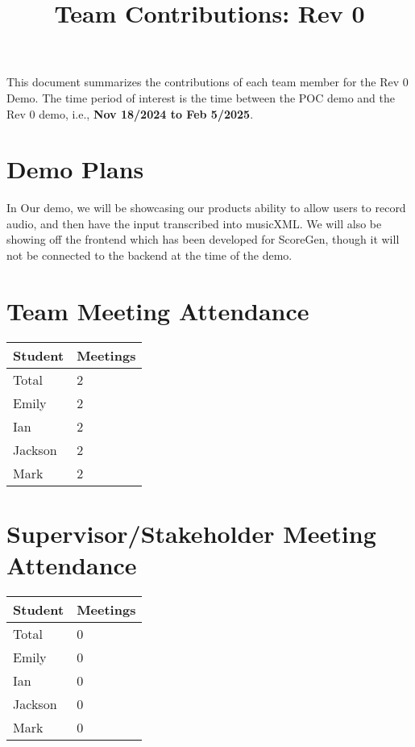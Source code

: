 \documentclass{article}
\title{Team Contributions: Rev 0\\\progname}
\author{\authname}
\date{}
\begin{document}
\maketitle

This document summarizes the contributions of each team member for the Rev 0
Demo.  The time period of interest is the time between the POC demo and the Rev
0 demo, i.e., \textbf{Nov 18/2024 to Feb 5/2025}.

\section{Demo Plans}

In Our demo, we will be showcasing our products ability to allow users to record audio, and then have the input transcribed into musicXML. We will also be showing off the frontend which has been developed for ScoreGen, though it will not be connected to the backend at the time of the demo.

\section{Team Meeting Attendance}

\begin{table}[H]
\centering
\begin{tabular}{ll}
\toprule
\textbf{Student} & \textbf{Meetings}\\
\midrule
Total & 2\\
Emily & 2\\
Ian & 2\\
Jackson & 2\\
Mark & 2\\
\bottomrule
\end{tabular}
\end{table}

\section{Supervisor/Stakeholder Meeting Attendance}

\begin{table}[H]
\centering
\begin{tabular}{ll}
\toprule
\textbf{Student} & \textbf{Meetings}\\
\midrule
Total & 0\\
Emily & 0\\
Ian & 0\\
Jackson & 0\\
Mark & 0\\
\bottomrule
\end{tabular}
\end{table}
\end{document}

